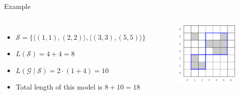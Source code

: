 \documentclass[10pt]{beamer}
\begin{document}
\begin{frame}{Example}

    \begin{columns}[T, onlytextwidth]
            \begin{itemize}
                \item $\mathcal{S} = \{ \langle (1,1),(2, 2) \rangle, \langle(3, 3),(5,5)\rangle\}$
                \item $L(\mathcal{S}) = 4 + 4 = 8$
                \item $L(\mathcal{G} \mid \mathcal{S}) = 2\cdot (1 + 4) = 10$
                \item Total length of this model is $8 + 10 = 18$
            \end{itemize}

        \begin{figure}
            \centering
            \includegraphics[scale=0.5]{figures/running-example/MDL/example-1.pdf}
        \end{figure}
    \end{columns}
\end{frame}
\end{document}
